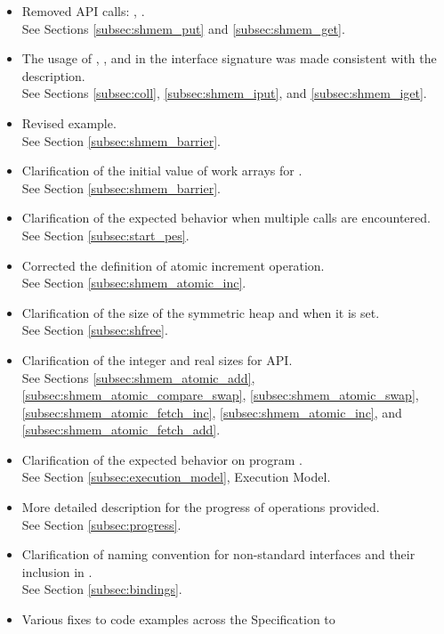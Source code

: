 \begin{itemize}
%
\item Removed \ac{API} calls: ,
      .
\\See Sections \ref{subsec:shmem_put} and \ref{subsec:shmem_get}.
%
\item The usage of , , and  in the
      interface signature was made consistent with the description.
\\See Sections \ref{subsec:coll}, \ref{subsec:shmem_iput}, and \ref{subsec:shmem_iget}.
%
\item Revised  example.
\\See Section \ref{subsec:shmem_barrier}.
%
\item Clarification of the initial value of  work arrays for
.\\ See Section \ref{subsec:shmem_barrier}.
%
\item Clarification of the expected behavior when multiple 
calls are encountered.
\\See Section \ref{subsec:start_pes}.
%
\item Corrected the definition of atomic increment operation.
\\See Section \ref{subsec:shmem_atomic_inc}.
%
\item Clarification of the size of the symmetric heap and when it is set.
\\See Section \ref{subsec:shfree}.
%
\item Clarification of the integer and real sizes for \Fortran \ac{API}.
\\See Sections \ref{subsec:shmem_atomic_add},
      \ref{subsec:shmem_atomic_compare_swap},
      \ref{subsec:shmem_atomic_swap},
      \ref{subsec:shmem_atomic_fetch_inc},
      \ref{subsec:shmem_atomic_inc}, and
      \ref{subsec:shmem_atomic_fetch_add}.
%
\item Clarification of the expected behavior on program .
\\See Section \ref{subsec:execution_model}, Execution Model.
%
\item More detailed description for the progress of \openshmem operations
provided.
\\See Section \ref{subsec:progress}.
%
\item Clarification of naming convention for non-standard interfaces and their
inclusion in .
\\See Section \ref{subsec:bindings}.
%
\item Various fixes to \openshmem code examples across the Specification to

\end{itemize}
